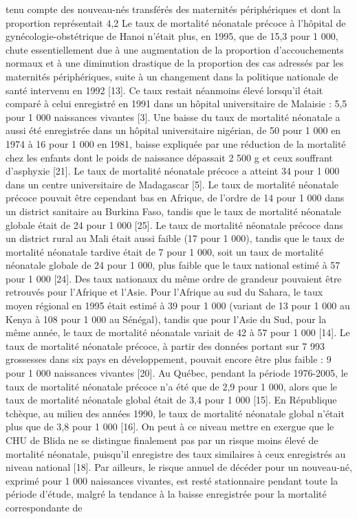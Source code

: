 tenu compte des nouveau-nés transférés des maternités
périphériques et dont la proportion représentait 4,2 %
Le taux de mortalité néonatale précoce à l’hôpital de
gynécologie-obstétrique de Hanoi n’était plus, en 1995, que
de 15,3 pour 1 000, chute essentiellement due à une
augmentation de la proportion d’accouchements normaux
et à une diminution drastique de la proportion des cas
adressés par les maternités périphériques, suite à un
changement dans la politique nationale de santé intervenu
en 1992 [13]. Ce taux restait néanmoins élevé lorsqu’il était
comparé à celui enregistré en 1991 dans un hôpital
universitaire de Malaisie : 5,5 pour 1 000 naissances
vivantes [3]. Une baisse du taux de mortalité néonatale a
aussi été enregistrée dans un hôpital universitaire nigérian, de
50 pour 1 000 en 1974 à 16 pour 1 000 en 1981, baisse
expliquée par une réduction de la mortalité chez les enfants
dont le poids de naissance dépassait 2 500 g et ceux
souffrant d’asphyxie [21]. Le taux de mortalité néonatale
précoce a atteint 34 pour 1 000 dans un centre universitaire
de Madagascar [5].
Le taux de mortalité néonatale précoce pouvait être
cependant bas en Afrique, de l’ordre de 14 pour 1 000 dans
un district sanitaire au Burkina Faso, tandis que le taux de
mortalité néonatale globale était de 24 pour 1 000 [25].
Le taux de mortalité néonatale précoce dans un district
rural au Mali était aussi faible (17 pour 1 000), tandis que le
taux de mortalité néonatale tardive était de 7 pour 1 000, soit
un taux de mortalité néonatale globale de 24 pour 1 000, plus
faible que le taux national estimé à 57 pour 1 000 [24].
Des taux nationaux du même ordre de grandeur pouvaient
être retrouvés pour l’Afrique et l’Asie. Pour l’Afrique au sud
du Sahara, le taux moyen régional en 1995 était estimé à
39 pour 1 000 (variant de 13 pour 1 000 au Kenya à 108 pour
1 000 au Sénégal), tandis que pour l’Asie du Sud, pour la
même année, le taux de mortalité néonatale variait de 42 à
57 pour 1 000 [14].
Le taux de mortalité néonatale précoce, à partir des
données portant sur 7 993 grossesses dans six pays en
développement, pouvait encore être plus faible : 9 pour
1 000 naissances vivantes [20]. Au Québec, pendant la
période 1976-2005, le taux de mortalité néonatale précoce
n’a été que de 2,9 pour 1 000, alors que le taux de mortalité
néonatale global était de 3,4 pour 1 000 [15]. En République
tchèque, au milieu des années 1990, le taux de mortalité
néonatale global n’était plus que de 3,8 pour 1 000 [16].
On peut à ce niveau mettre en exergue que le CHU de
Blida ne se distingue finalement pas par un risque moins
élevé de mortalité néonatale, puisqu’il enregistre des taux
similaires à ceux enregistrés au niveau national [18]. Par
ailleurs, le risque annuel de décéder pour un nouveau-né,
exprimé pour 1 000 naissances vivantes, est resté stationnaire
pendant toute la période d’étude, malgré la tendance à la
baisse enregistrée pour la mortalité correspondante de

